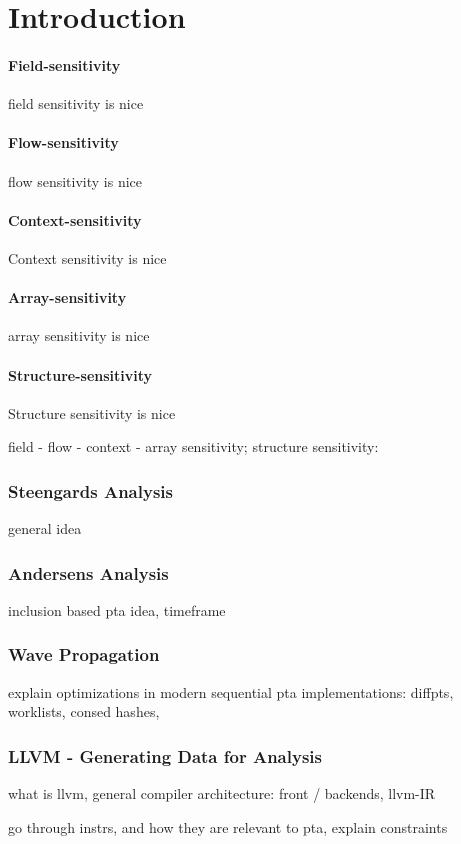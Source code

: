 \chapter{Introduction} \label{chap:intro}
\subsubsection{Field-sensitivity}
field sensitivity is nice
\subsubsection{Flow-sensitivity}
flow sensitivity is nice
\subsubsection{Context-sensitivity}
Context sensitivity is nice
\subsubsection{Array-sensitivity}
array sensitivity is nice
\subsubsection{Structure-sensitivity}
Structure sensitivity is nice

field - flow - context - array sensitivity; structure sensitivity: \autocite{balatsouras2016structure}
\subsection{Steengards Analysis}
general idea
\subsection{Andersens Analysis}
inclusion based pta idea, timeframe
\subsection{Wave Propagation}
explain optimizations in modern sequential pta implementations: diffpts, worklists, consed hashes, \autocite{pereirawave}
\subsection{LLVM - Generating Data for Analysis}
what is llvm, general compiler architecture: front / backends, llvm-IR

go through instrs, and how they are relevant to pta, explain constraints \autocite{lin2015alias}
